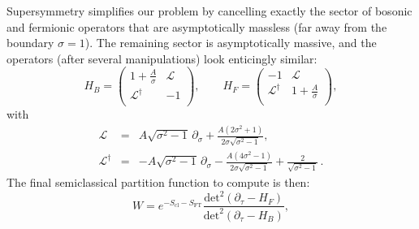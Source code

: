 Supersymmetry simplifies our problem by cancelling exactly 
the sector of bosonic and fermionic operators that are asymptotically massless (far away from the boundary $\sigma=1$).
The remaining sector is asymptotically massive, and the operators (after several manipulations) look enticingly similar:
\begin{equation}\label{basicDirac}
 H_B=\begin{pmatrix}
  1+\frac{A}{\sigma }  & \mathcal{L} \\ 
  \mathcal{L}^\dagger  & -1 \\ 
 \end{pmatrix},\qquad 
  H_F=\begin{pmatrix}
  -1                   & \mathcal{L} \\ 
  \mathcal{L}^\dagger  & 1+\frac{A}{\sigma }  \\ 
 \end{pmatrix},
\end{equation}
with
\begin{eqnarray}\label{EuclideanLs}
 \mathcal{L}&=&A\sqrt{\sigma ^2-1}\,\partial _\sigma +\frac{A\left(2\sigma ^2+1\right)}{2\sigma \sqrt{\sigma ^2-1}} ,
\nonumber \\
 \mathcal{L}^\dagger &=&-A\sqrt{\sigma ^2-1}\,\partial _\sigma 
-\frac{A\left(4\sigma ^2-1\right)}{2\sigma \sqrt{\sigma ^2-1}}
+\frac{2}{\sqrt{\sigma ^2-1}}\,.
\end{eqnarray}
The final semiclassical partition function to compute is then:
\begin{equation}\label{semiclassicalW}
  W = e^{-S_\text{cl}-S_\text{FT}}\dfrac{\text{det}^2 (\partial_\tau-H_F)}{\text{det}^2 (\partial_\tau-H_B)},
\end{equation}


